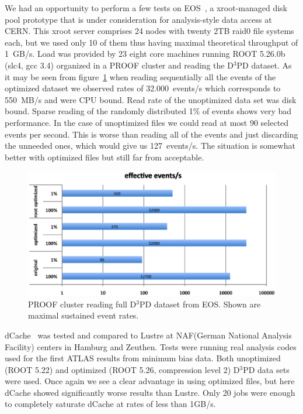 \documentclass[a4paper]{jpconf}
\begin{document}
We had an opportunity to perform a few tests on EOS~\cite{EOS}, a xroot-managed disk pool prototype that is under consideration for analysis-style data access at CERN. This xroot server comprises 24 nodes with twenty 2TB raid0 file systems each, but we used only 10 of them thus having maximal theoretical throughput of 1~GB/s. Load was provided by 23 eight core machines running ROOT 5.26.0b (slc4, gcc 3.4) organized in a PROOF cluster and reading the D$^3$PD dataset.
As it may be seen from figure~\ref{fig_EOS} when reading sequentially all the events of the optimized dataset we observed rates of 32.000~events/s which corresponds to 550~MB/s and were CPU bound. Read rate of the unoptimized data set was disk bound. Sparse reading of the randomly distributed 1\% of events shows very bad performance. In the case of unoptimized files we could read at most 90 selected events per second. This is worse than reading all of the events and just discarding the unneeded ones, which would give us 127~events/s. The situation is somewhat better with optimized files but still far from acceptable.  

\begin{figure}[h]
\begin{center}	
\includegraphics[scale=0.6]{EOS.eps}
\end{center}
\caption{\label{fig_EOS}PROOF cluster reading full D$^3$PD dataset from EOS. Shown are maximal sustained event rates.}
\end{figure}

dCache~\cite{dcache} was tested and compared to Lustre at NAF(German National Analysis Facility) centers in Hamburg and Zeuthen. Tests were running real analysis codes used for the first ATLAS results from minimum bias data. Both unoptimized (ROOT 5.22) and optimized (ROOT 5.26, compression level 2) D$^3$PD data sets were used. Once again we see a clear advantage in using optimized files, but here dCache showed significantly worse results than Lustre. Only 20 jobs were enough to completely saturate dCache at rates of less than 1GB/s.
\end{document}
